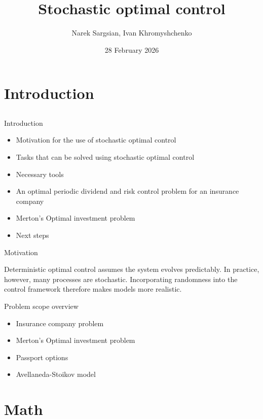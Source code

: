 \documentclass{beamer}
\title[Stochastic optimal control]{Stochastic optimal control}
\author[Narek Sargsian, Ivan Khromyshchenko]{Narek Sargsian, Ivan Khromyshchenko}
\institute[HSE FES]{HSE FES Probability Theory Club}
\date{28 February 2026}
\theoremstyle{definition}
\begin{document}
\begin{frame}
    \titlepage
\end{frame}

\section{Introduction}
\subsection{}

\begin{frame}{Introduction}

\begin{itemize}
    \item Motivation for the use of stochastic optimal control
    \item Tasks that can be solved using stochastic optimal control
    \item Necessary tools
    \item An optimal periodic dividend and risk control problem for an insurance company
    \item Merton's Optimal investment problem  
    \item Next steps
\end{itemize}
    
\end{frame}

\begin{frame}{Motivation}

Deterministic optimal control assumes the system evolves predictably. In practice, however, many processes are stochastic. Incorporating randomness into the control framework therefore makes models more realistic.

\end{frame}

\begin{frame}{Problem scope overview}

\begin{itemize}
    \item Insurance company problem
    \item Merton's Optimal investment problem
    \item Passport options
    \item Avellaneda-Stoikov model
\end{itemize}
\end{frame}


\section{Math}
\end{document}
